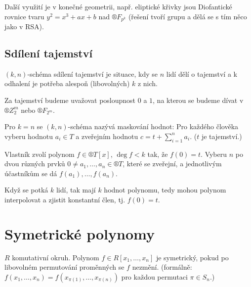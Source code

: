 \documentclass[12pt]{article}                   %
\begin{document}
    \begin{poznamka}
        Další využití je v konečné geometrii, např. eliptické křivky jsou Diofantické rovnice tvaru $y^2 = x^3 + ax + b$ nad $®F_{p^k}$ (řešení tvoří grupu a dělá se s tím něco jako v RSA).
    \end{poznamka}

    \subsection{Sdílení tajemství}
        \begin{definice}
            $(k, n)$-schéma sdílení tajemství je situace, kdy se $n$ lidí dělí o tajemství a k odhalení je potřeba alespoň (libovolných) $k$ z nich.
        \end{definice}

        \begin{definice}[Tajemství]
            Za tajemství budeme uvažovat posloupnost $0$ a $1$, na kterou se budeme dívat v $®Z_2^m$ nebo $®F_{2^m}$.
        \end{definice}

        \begin{poznamka}
            Pro $k = n$ se $(k, n)$-schéma nazývá maskování hodnot: Pro každého člověka vyberu hodnotu $a_i \in T$ a zveřejním hodnotu $c = t + \sum_{i=1}^n a_i$. ($t$ je tajemství.)
        \end{poznamka}

        \begin{definice}
                Vlastník zvolí polynom $f \in ®T[x]$, $\deg f < k$ tak, že $f(0) = t$. Vyberu $n$ po dvou různých prvků $0 ≠ a_1, …, a_n \in ®T$, které se zveřejní, a jednotlivým účastníkům se dá $f(a_1), …, f(a_n)$.

            Když se potká $k$ lidí, tak mají $k$ hodnot polynomu, tedy mohou polynom interpolovat a zjistit konstantní člen, tj. $f(0) = t$.
        \end{definice}

\section{Symetrické polynomy}
    \begin{definice}
            $R$ komutativní okruh. Polynom $f \in R[x_1, …, x_n]$ je symetrický, pokud po libovolném permutování proměnných se $f$ nezmění. (formálně: $f(x_1, …, x_n) = f(x_{\pi(1)}, …, x_{\pi(n)})$ pro každou permutaci $\pi \in S_n$.)
    \end{definice}
\end{document}
